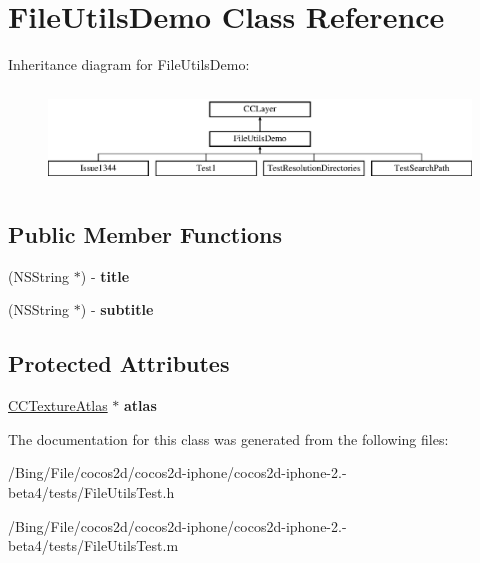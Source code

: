 \hypertarget{interface_file_utils_demo}{\section{File\-Utils\-Demo Class Reference}
\label{interface_file_utils_demo}
}
Inheritance diagram for File\-Utils\-Demo\-:\begin{figure}[H]
\begin{center}
\leavevmode
\includegraphics[height=2.576687cm]{interface_file_utils_demo}
\end{center}
\end{figure}
\subsection*{Public Member Functions}
\begin{DoxyCompactItemize}
\item 
\hypertarget{interface_file_utils_demo_a888f929acf978712dcab03a9fb0431b8}{(N\-S\-String $\ast$) -\/ {\bfseries title}}\label{interface_file_utils_demo_a888f929acf978712dcab03a9fb0431b8}

\item 
\hypertarget{interface_file_utils_demo_aaff069992ab4fb147886396265182b7d}{(N\-S\-String $\ast$) -\/ {\bfseries subtitle}}\label{interface_file_utils_demo_aaff069992ab4fb147886396265182b7d}

\end{DoxyCompactItemize}
\subsection*{Protected Attributes}
\begin{DoxyCompactItemize}
\item 
\hypertarget{interface_file_utils_demo_a8c230757de726a471d4eadc36f72ccf6}{\hyperlink{interface_c_c_texture_atlas}{C\-C\-Texture\-Atlas} $\ast$ {\bfseries atlas}}\label{interface_file_utils_demo_a8c230757de726a471d4eadc36f72ccf6}

\end{DoxyCompactItemize}


The documentation for this class was generated from the following files\-:\begin{DoxyCompactItemize}
\item 
/\-Bing/\-File/cocos2d/cocos2d-\/iphone/cocos2d-\/iphone-\/2.-\/beta4/tests/File\-Utils\-Test.\-h\item 
/\-Bing/\-File/cocos2d/cocos2d-\/iphone/cocos2d-\/iphone-\/2.-\/beta4/tests/File\-Utils\-Test.\-m\end{DoxyCompactItemize}
